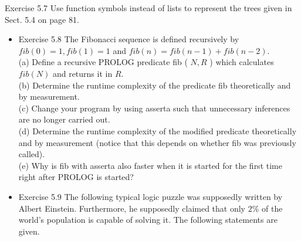 \documentclass[10pt]{book}
\begin{document}
\begin{center}
Exercise 5.7 Use function symbols instead of lists to represent the trees given in Sect. 5.4 on page 81.

\begin{itemize}
  \item Exercise 5.8 The Fibonacci sequence is defined recursively by $f i b(0)=1, f i b(1)=1$ and $f i b(n)=f i b(n-1)+f i b(n-2)$.\\
(a) Define a recursive PROLOG predicate fib ( $N, R$ ) which calculates $f i b(N)$ and returns it in $R$.\\
(b) Determine the runtime complexity of the predicate fib theoretically and by measurement.\\
(c) Change your program by using asserta such that unnecessary inferences are no longer carried out.\\
(d) Determine the runtime complexity of the modified predicate theoretically and by measurement (notice that this depends on whether fib was previously called).\\
(e) Why is fib with asserta also faster when it is started for the first time right after PROLOG is started?
  \item Exercise 5.9 The following typical logic puzzle was supposedly written by Albert Einstein. Furthermore, he supposedly claimed that only $2 \%$ of the world's population is capable of solving it. The following statements are given.
\end{itemize}


\end{center}
\end{document}
